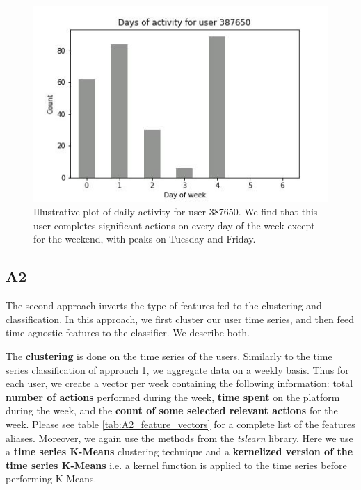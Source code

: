 \documentclass[sigplan,screen]{acmart}
\begin{document}
\begin{figure}
    \centering
    \includegraphics[width=\linewidth]{reports/figures/PWHex.jpg}
    \caption{Illustrative plot of daily activity for user 387650. We find that this user completes significant actions on every day of the week except for the weekend, with peaks on Tuesday and Friday.}
    \label{fig:PWHex}
\end{figure}


\subsection{A2}\label{subsec:A2}

The second approach inverts the type of features fed to the clustering and classification. In this approach, we first cluster our user time series, and then feed time agnostic features to the classifier. We describe both.

The \textbf{clustering} is done on the time series of the users. Similarly to the time series classification of approach 1, we aggregate data on a weekly basis. Thus for each user, we create a vector per week containing the following information: total \textbf{number of actions} performed during the week, \textbf{time spent} on the platform during the week, and the \textbf{count of some selected relevant actions} for the week. Please see table \ref{tab:A2_feature_vectors} for a complete list of the features aliases. Moreover, we again use the methods from the  \emph{tslearn} \cite{tslearn} library. Here we use a \textbf{time series K-Means} clustering technique and a \textbf{kernelized version of the time series K-Means} i.e. a kernel function is applied to the time series before performing K-Means.
\end{document}
